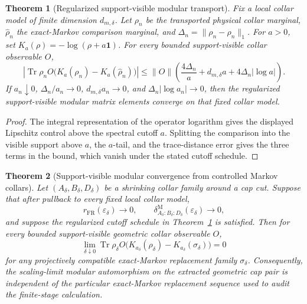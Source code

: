 \documentclass[11pt]{article}
\newtheorem{theorem}{Theorem}[section]
\begin{document}
\begin{theorem}[Regularized support-visible modular transport]\label{thm:regularized-modular-transport}
Fix a local collar model of finite dimension \(d_{m,\delta}\). Let \(\rho_n\) be the transported physical collar marginal, \(\widehat\rho_n\) the exact-Markov comparison marginal, and \(\Delta_n=\|\rho_n-\widehat\rho_n\|_1\). For \(a>0\), set \(K_a(\rho)=-\log(\rho+a\mathbf 1)\). For every bounded support-visible collar observable \(O\),
\[
\left|\operatorname{Tr}\rho_n O\bigl(K_a(\rho_n)-K_a(\widehat\rho_n)\bigr)\right|
\le
\|O\|\left(\frac{4\Delta_n}{a}+d_{m,\delta}a+4\Delta_n|\log a|\right).
\]
If \(a_n\downarrow0\), \(\Delta_n/a_n\to0\), \(d_{m,\delta}a_n\to0\), and \(\Delta_n|\log a_n|\to0\), then the regularized support-visible modular matrix elements converge on that fixed collar model.
\end{theorem}

\begin{proof}
The integral representation of the operator logarithm gives the displayed Lipschitz control above the spectral cutoff \(a\). Splitting the comparison into the visible support above \(a\), the \(a\)-tail, and the trace-distance error gives the three terms in the bound, which vanish under the stated cutoff schedule.
\end{proof}

\begin{theorem}[Support-visible modular convergence from controlled Markov collars]\label{thm:support-visible-modular-convergence}
Let \((A_\delta,B_\delta,D_\delta)\) be a shrinking collar family around a cap
cut. Suppose that after pullback to every fixed local collar model,
\[
r_{\mathrm{FR}}(\varepsilon_\delta)\to0,\qquad
\delta^{\mathrm M}_{A_\delta:B_\delta:D_\delta}(\varepsilon_\delta)\to0,
\]
and suppose the regularized cutoff schedule in
Theorem~\ref{thm:regularized-modular-transport} is satisfied. Then for every
bounded support-visible geometric collar observable \(O\),
\[
\lim_{\delta\downarrow0}
\operatorname{Tr}\rho_\delta O
\bigl(
K_{a_\delta}(\rho_\delta)-K_{a_\delta}(\sigma_\delta)
\bigr)
=0
\]
for any projectively compatible exact-Markov replacement family
\(\sigma_\delta\). Consequently, the scaling-limit modular automorphism on the
extracted geometric cap pair is independent of the particular exact-Markov
replacement sequence used to audit the finite-stage calculation.
\end{theorem}
\end{document}
